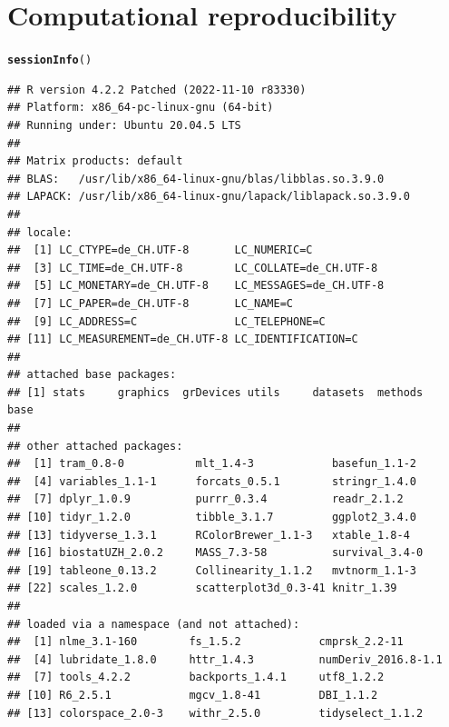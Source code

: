 \documentclass[11pt,a4paper,twoside]{book}\usepackage[]{graphicx}\usepackage[]{xcolor}
\makeatletter
\newcommand{\hlstd}[1]{\textcolor[rgb]{0.345,0.345,0.345}{#1}}%
\newcommand{\hlkwd}[1]{\textcolor[rgb]{0.737,0.353,0.396}{\textbf{#1}}}%
\newenvironment{kframe}{%
 \def\at@end@of@kframe{}%
 \ifinner\ifhmode%
  \def\at@end@of@kframe{\end{minipage}}%
  \begin{minipage}{\columnwidth}%
 \fi\fi%
 \def\FrameCommand##1{\hskip\@totalleftmargin \hskip-\fboxsep
 \colorbox{shadecolor}{##1}\hskip-\fboxsep
     \hskip-\linewidth \hskip-\@totalleftmargin \hskip\columnwidth}%
 \MakeFramed {\advance\hsize-\width
   \@totalleftmargin\z@ \linewidth\hsize
   \@setminipage}}%
 {\par\unskip\endMakeFramed%
 \at@end@of@kframe}
\newenvironment{knitrout}{}{} %
\makeatother
\begin{document}
\newpage
\section{Computational reproducibility}\label{sec:repro}




\newpage
\begin{knitrout}
\color{fgcolor}\begin{kframe}
\begin{alltt}
\hlkwd{sessionInfo}\hlstd{()}
\end{alltt}
\begin{verbatim}
## R version 4.2.2 Patched (2022-11-10 r83330)
## Platform: x86_64-pc-linux-gnu (64-bit)
## Running under: Ubuntu 20.04.5 LTS
## 
## Matrix products: default
## BLAS:   /usr/lib/x86_64-linux-gnu/blas/libblas.so.3.9.0
## LAPACK: /usr/lib/x86_64-linux-gnu/lapack/liblapack.so.3.9.0
## 
## locale:
##  [1] LC_CTYPE=de_CH.UTF-8       LC_NUMERIC=C              
##  [3] LC_TIME=de_CH.UTF-8        LC_COLLATE=de_CH.UTF-8    
##  [5] LC_MONETARY=de_CH.UTF-8    LC_MESSAGES=de_CH.UTF-8   
##  [7] LC_PAPER=de_CH.UTF-8       LC_NAME=C                 
##  [9] LC_ADDRESS=C               LC_TELEPHONE=C            
## [11] LC_MEASUREMENT=de_CH.UTF-8 LC_IDENTIFICATION=C       
## 
## attached base packages:
## [1] stats     graphics  grDevices utils     datasets  methods   base     
## 
## other attached packages:
##  [1] tram_0.8-0           mlt_1.4-3            basefun_1.1-2       
##  [4] variables_1.1-1      forcats_0.5.1        stringr_1.4.0       
##  [7] dplyr_1.0.9          purrr_0.3.4          readr_2.1.2         
## [10] tidyr_1.2.0          tibble_3.1.7         ggplot2_3.4.0       
## [13] tidyverse_1.3.1      RColorBrewer_1.1-3   xtable_1.8-4        
## [16] biostatUZH_2.0.2     MASS_7.3-58          survival_3.4-0      
## [19] tableone_0.13.2      Collinearity_1.1.2   mvtnorm_1.1-3       
## [22] scales_1.2.0         scatterplot3d_0.3-41 knitr_1.39          
## 
## loaded via a namespace (and not attached):
##  [1] nlme_3.1-160        fs_1.5.2            cmprsk_2.2-11      
##  [4] lubridate_1.8.0     httr_1.4.3          numDeriv_2016.8-1.1
##  [7] tools_4.2.2         backports_1.4.1     utf8_1.2.2         
## [10] R6_2.5.1            mgcv_1.8-41         DBI_1.1.2          
## [13] colorspace_2.0-3    withr_2.5.0         tidyselect_1.1.2   

\end{verbatim}
\end{kframe}
\end{knitrout}
\end{document}
